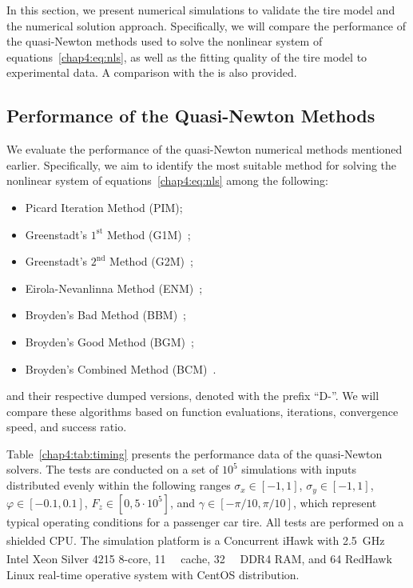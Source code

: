 In this section, we present numerical simulations to validate the tire model and the numerical solution approach. Specifically, we will compare the performance of the quasi-Newton methods used to solve the nonlinear system of equations~\eqref{chap4:eq:nls}, as well as the fitting quality of the tire model to experimental data. A comparison with the \MagicFormulae{} is also provided.

\subsection{Performance of the Quasi-Newton Methods}

We evaluate the performance of the quasi-Newton numerical methods mentioned earlier. Specifically, we aim to identify the most suitable method for solving the nonlinear system of equations~\eqref{chap4:eq:nls} among the following:
%
\begin{itemize}
  \setlength{\itemsep}{0pt}
  \item Picard Iteration Method (PIM);
  \item Greenstadt's $1^\text{st}$ Method (G1M)~\cite{spedicato1978some};
  \item Greenstadt's $2^\text{nd}$ Method (G2M)~\cite{spedicato1978some};
  \item Eirola-Nevanlinna Method (ENM)~\cite{eirola1989accelerating};
  \item Broyden's Bad Method (BBM)~\cite{broyden1965class};
  \item Broyden's Good Method (BGM)~\cite{broyden1965class};
  \item Broyden's Combined Method (BCM)~\cite{martinez1982sobre}.
\end{itemize}
%
and their respective dumped versions, denoted with the prefix ``D-''. We will compare these algorithms based on function evaluations, iterations, convergence speed, and success ratio.

Table~\ref{chap4:tab:timing} presents the performance data of the quasi-Newton solvers. The tests are conducted on a set of $10^5$ simulations with inputs distributed evenly within the following ranges $\sigma_x\in[-1,1]$, $\sigma_y\in[-1,1]$, $\varphi\in[-0.1,0.1]$, $F_z\in[0,5\cdot10^5]$, and $\gamma \in [-\pi/10, \pi/10]$, which represent typical operating conditions for a passenger car tire. All tests are performed on a shielded CPU. The simulation platform is a Concurrent\textsuperscript{\textregistered} iHawk\textsuperscript{\texttrademark} with \SI{2.5}{\giga\hertz} Intel\textsuperscript{\textregistered} Xeon\textsuperscript{\textregistered} Silver 4215 8-core, \SI{11}{\mega\byte} cache, \SI{32}{\giga\byte} DDR4 RAM, and \SI{64}{\bit} RedHawk\textsuperscript{\texttrademark} Linux real-time operative system with CentOS distribution.

